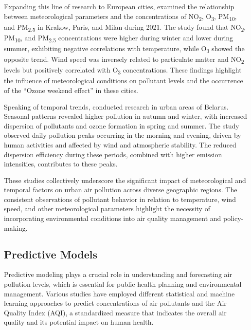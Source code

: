 \documentclass[twoside,11pt]{article}
\begin{document}
Expanding this line of research to European cities, \citep{Rowland2024} examined the relationship between meteorological parameters and the concentrations of NO\textsubscript{2}, O\textsubscript{3}, PM\textsubscript{10}, and PM\textsubscript{2.5} in Krakow, Paris, and Milan during 2021. The study found that NO\textsubscript{2}, PM\textsubscript{10}, and PM\textsubscript{2.5} concentrations were higher during winter and lower during summer, exhibiting negative correlations with temperature, while O\textsubscript{3} showed the opposite trend. Wind speed was inversely related to particulate matter and NO\textsubscript{2} levels but positively correlated with O\textsubscript{3} concentrations. These findings highlight the influence of meteorological conditions on pollutant levels and the occurrence of the “Ozone weekend effect” in these cities.

Speaking of temporal trends, \citep{bozhkova2020influence} conducted research in urban areas of Belarus. Seasonal patterns revealed higher pollution in autumn and winter, with increased dispersion of pollutants and ozone formation in spring and summer. The study observed daily pollution peaks occurring in the morning and evening, driven by human activities and affected by wind and atmospheric stability. The reduced dispersion efficiency during these periods, combined with higher emission intensities, contributes to these peaks.

These studies collectively underscore the significant impact of meteorological and temporal factors on urban air pollution across diverse geographic regions. The consistent observations of pollutant behavior in relation to temperature, wind speed, and other meteorological parameters highlight the necessity of incorporating environmental conditions into air quality management and policy-making.


\subsection{Predictive Models}

Predictive modeling plays a crucial role in understanding and forecasting air pollution levels, which is essential for public health planning and environmental management. Various studies have employed different statistical and machine learning approaches to predict concentrations of air pollutants and the Air Quality Index (AQI), a standardized measure that indicates the overall air quality and its potential impact on human health.
\end{document}
